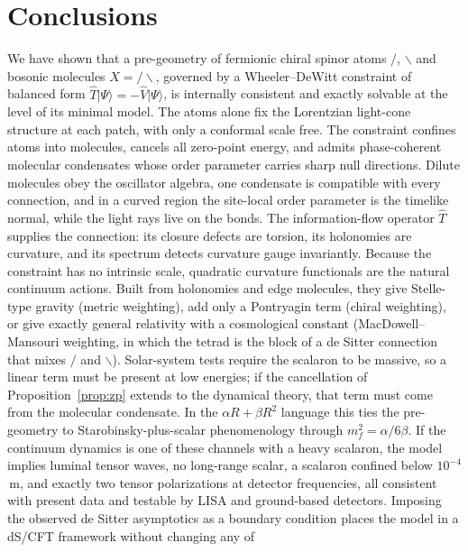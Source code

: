 \documentclass[reprint,aps,prd,amsmath,amssymb,superscriptaddress,nofootinbib,floatfix]{revtex4-2}
\theoremstyle{plain}
\theoremstyle{definition}
\theoremstyle{remark}
\newcommand{\Lat}{\ensuremath{/}}                 %
\newcommand{\Rat}{\ensuremath{\backslash}}        %
\newcommand{\Mol}{\ensuremath{X}}                 %
\newcommand{\ket}[1]{\ensuremath{|#1\rangle}}
\newcommand{\Tc}{\hat{T}}
\newcommand{\Vc}{\hat{V}}
\begin{document}
\section{Conclusions}
\label{sec:conclusions}

We have shown that a pre-geometry of fermionic chiral spinor atoms $\Lat$, $\Rat$ and bosonic molecules $\Mol=\Lat\Rat$,
governed by a Wheeler--DeWitt constraint of balanced form $\Tc\ket\Psi=-\Vc\ket\Psi$, is internally consistent and exactly
solvable at the level of its minimal model. The atoms alone fix the Lorentzian light-cone structure at each
patch, with only a conformal scale free. The constraint confines atoms into molecules, cancels all
zero-point energy, and admits phase-coherent molecular condensates whose order parameter carries sharp null
directions. Dilute molecules obey the oscillator algebra, one condensate is compatible with every connection, and in a
curved region the site-local order parameter is the timelike normal, while the light rays live on the bonds. The information-flow
operator $\Tc$ supplies the connection: its closure defects are torsion, its holonomies are curvature, and
its spectrum detects curvature gauge invariantly. Because the constraint has no intrinsic scale,
quadratic curvature functionals are the natural continuum actions. Built from holonomies and edge
molecules, they give Stelle-type gravity (metric weighting), add only a Pontryagin term (chiral weighting),
or give exactly general relativity with a cosmological constant (MacDowell--Mansouri weighting, in which
the tetrad is the block of a de Sitter connection that mixes $\Lat$ and $\Rat$). Solar-system tests require the
scalaron to be massive, so a linear term must be present at low energies; if the cancellation of Proposition~\ref{prop:zp}
extends to the dynamical theory, that term must come from the molecular condensate. In the
$\alpha R+\beta R^2$ language this ties the pre-geometry to Starobinsky-plus-scalar phenomenology through
$m_f^2=\alpha/6\beta$. If the continuum dynamics is one of these channels with a heavy scalaron, the model implies luminal
tensor waves, no long-range scalar, a scalaron confined below $10^{-4}$\,m, and exactly two tensor polarizations at
detector frequencies, all consistent with present data and testable by LISA and ground-based detectors. Imposing the
observed de Sitter asymptotics as a boundary condition places the model in a dS/CFT framework without changing any of
\end{document}
